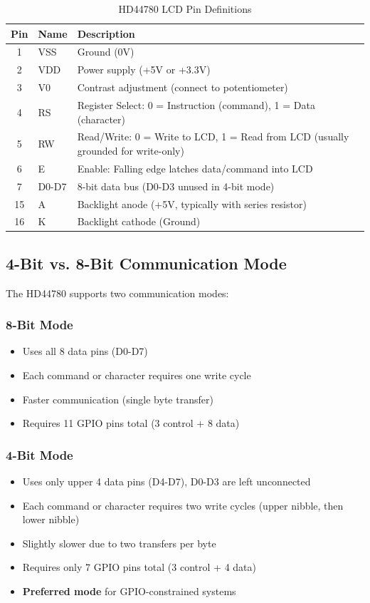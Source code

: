 \begin{table}[H]
\centering
\small
\renewcommand{\arraystretch}{1.3}
\begin{tabular}{clp{8.5cm}}
\toprule
\textbf{Pin} & \textbf{Name} & \textbf{Description} \\
\midrule
1 & VSS & Ground (0V) \\
2 & VDD & Power supply (+5V or +3.3V) \\
3 & V0 & Contrast adjustment (connect to potentiometer) \\
4 & RS & Register Select: 0 = Instruction (command), 1 = Data (character) \\
5 & RW & Read/Write: 0 = Write to LCD, 1 = Read from LCD (usually grounded for write-only) \\
6 & E & Enable: Falling edge latches data/command into LCD \\
7\-14 & D0-D7 & 8-bit data bus (D0-D3 unused in 4-bit mode) \\
15 & A & Backlight anode (+5V, typically with series resistor) \\
16 & K & Backlight cathode (Ground) \\
\bottomrule
\end{tabular}
\caption{HD44780 LCD Pin Definitions}
\end{table}

\subsection{4-Bit vs. 8-Bit Communication Mode}

The HD44780 supports two communication modes:

\subsubsection{8-Bit Mode}
\begin{itemize}[nosep]
  \item Uses all 8 data pins (D0-D7)
  \item Each command or character requires one write cycle
  \item Faster communication (single byte transfer)
  \item Requires 11 GPIO pins total (3 control + 8 data)
\end{itemize}

\subsubsection{4-Bit Mode}
\begin{itemize}[nosep]
  \item Uses only upper 4 data pins (D4-D7), D0-D3 are left unconnected
  \item Each command or character requires two write cycles (upper nibble, then lower nibble)
  \item Slightly slower due to two transfers per byte
  \item Requires only 7 GPIO pins total (3 control + 4 data)
  \item \textbf{Preferred mode} for GPIO-constrained systems
\end{itemize}


